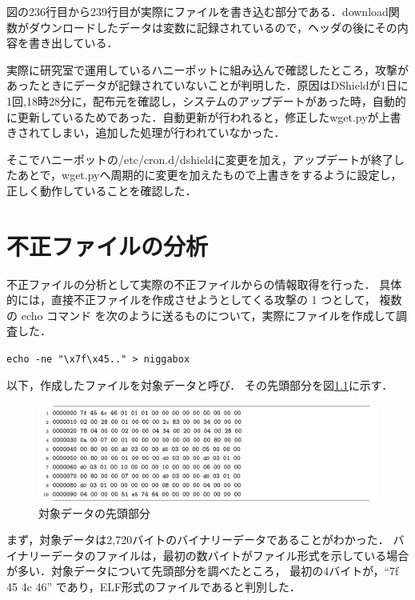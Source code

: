 \documentclass[dvipdfmx]{bta}
\begin{document}
図の236行目から239行目が実際にファイルを書き込む部分である．download関数がダウンロードしたデータは変数に記録されているので，ヘッダの後にその内容を書き出している．


実際に研究室で運用しているハニーポットに組み込んで確認したところ，攻撃があったときにデータが記録されていないことが判明した．原因はDShieldが1日に1回,18時28分に，配布元を確認し，システムのアップデートがあった時，自動的に更新しているためであった．自動更新が行われると，修正したwget.pyが上書きされてしまい，追加した処理が行われていなかった．

そこでハニーポットの/etc/cron.d/dshieldに変更を加え，アップデートが終了したあとで，wget.pyへ周期的に変更を加えたもので上書きをするように設定し，正しく動作していることを確認した．

\chapter{不正ファイルの分析}
不正ファイルの分析として実際の不正ファイルからの情報取得を行った．
具体的には，直接不正ファイルを作成させようとしてくる攻撃の 1 つとして，
複数の echo コマンド を次のように送るものについて，実際にファイルを作成して調査した．

\verb!echo -ne "\x7f\x45.." > niggabox!

以下，作成したファイルを対象データと呼び． その先頭部分を図\ref{fig:textcmds}に示す．

\begin{figure}[htbp]
	\centering
 	\includegraphics[scale = 0.75]{niggabox.png}
 	\caption{対象データの先頭部分}\label{fig:textcmds}
\end{figure}
まず，対象データは2,720バイトのバイナリーデータであることがわかった．
バイナリーデータのファイルは，最初の数バイトがファイル形式を示している場合が多い．対象データについて先頭部分を調べたところ，
最初の4バイトが，“7f 45 4c 46” であり，ELF形式\cite{elf}のファイルであると判別した．
\end{document}
